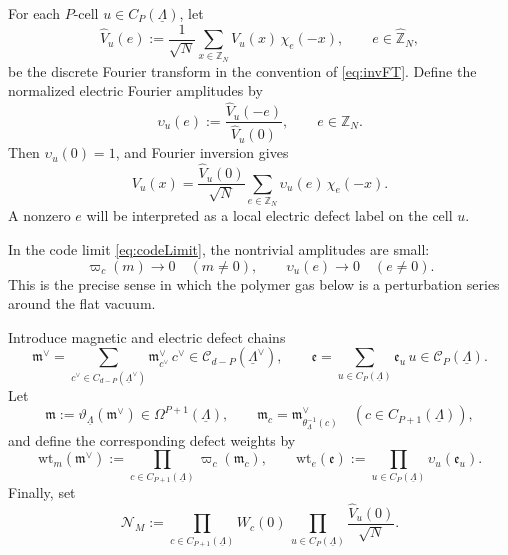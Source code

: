 \documentclass[dvipsnames,a4paper]{article}
\numberwithin{equation}{section}
\theoremstyle{definition}
\theoremstyle{remark}
\newcommand{\wt}{\mathrm{wt}}
\begin{document}
For each \(P\)-cell \(u\in C_P(\underline\Lambda)\), let
\begin{equation}
	\widehat V_u(e)
	:=
	\frac{1}{\sqrt N}
	\sum_{x\in \mathbb Z_N}
	V_u(x)\,\chi_e(-x),
	\qquad
	e\in \widehat{\mathbb Z}_N,
	\label{eq:Vu-fourier-transform}
\end{equation}
be the discrete Fourier transform in the convention of \eqref{eq:invFT}. Define the normalized electric Fourier
amplitudes by
\begin{equation}
	\upsilon_u(e)
	:=
	\frac{\widehat V_u(-e)}{\widehat V_u(0)},
	\qquad
	e\in \mathbb Z_N.
	\label{eq:electric-local-amplitude}
\end{equation}
Then \(\upsilon_u(0)=1\), and Fourier inversion gives
\begin{equation}
	V_u(x)
	=
	\frac{\widehat V_u(0)}{\sqrt N}
	\sum_{e\in \mathbb Z_N}
	\upsilon_u(e)\,\chi_e(-x).
	\label{eq:V-cell-expansion}
\end{equation}
A nonzero \(e\) will be interpreted as a local electric defect label on the cell \(u\).

In the code limit \eqref{eq:codeLimit}, the nontrivial amplitudes are
small:
\begin{equation}
	\varpi_c(m)\rightarrow 0 \quad (m\neq 0),
	\qquad
	\upsilon_u(e)\rightarrow 0 \quad (e\neq 0).
	\label{eq:nontrivial-local-amplitudes-small}
\end{equation}
This is the precise sense in which the polymer gas below is a perturbation series around
the flat vacuum.

Introduce magnetic and electric defect chains
\begin{equation}
	\mathfrak m^\vee
	=
	\sum_{c^\vee\in C_{d-P}(\underline\Lambda^\vee)}
	\mathfrak m_{c^\vee}^\vee\,c^\vee
	\in \mathcal C_{d-P}(\underline\Lambda^\vee),
	\qquad
	\mathfrak e
	=
	\sum_{u\in C_P(\underline\Lambda)}
	\mathfrak e_u\,u
	\in \mathcal C_P(\underline\Lambda).
\end{equation}
Let
\begin{equation}
	\mathfrak m
	:=
	\vartheta_{\underline\Lambda}(\mathfrak m^\vee)\in \Omega^{P+1}(\underline\Lambda),
	\qquad
	\mathfrak m_c
	=
	\mathfrak m^\vee_{\theta_{\underline\Lambda}^{-1}(c)}
	\quad
	(c\in C_{P+1}(\underline\Lambda)),
\end{equation}
and define the corresponding defect weights by
\begin{equation}
	\wt_m(\mathfrak m^\vee)
	:=
	\prod_{c\in C_{P+1}(\underline\Lambda)}\varpi_c(\mathfrak m_c),
	\qquad
	\wt_e(\mathfrak e)
	:=
	\prod_{u\in C_P(\underline\Lambda)}\upsilon_u(\mathfrak e_u).
	\label{eq:local-defect-weights}
\end{equation}
Finally, set
\begin{equation}
	\mathcal N_M
	:=
	\prod_{c\in C_{P+1}(\underline\Lambda)}W_c(0)\,
	\prod_{u\in C_P(\underline\Lambda)}\frac{\widehat V_u(0)}{\sqrt N}.
	\label{eq:NM-fixed-charge}
\end{equation}
\end{document}
